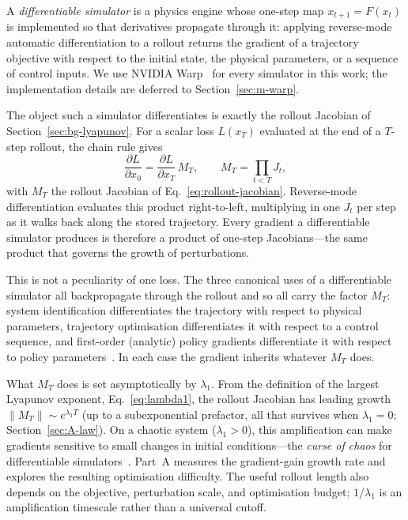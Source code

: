 \documentclass[11pt]{article}
\newcommand{\norm}[1]{\left\lVert #1 \right\rVert}
\begin{document}
A \emph{differentiable simulator} is a physics engine whose one-step map $x_{t+1}=F(x_t)$ is implemented so that derivatives propagate through it: applying reverse-mode automatic differentiation to a rollout returns the gradient of a trajectory objective with respect to the initial state, the physical parameters, or a sequence of control inputs. We use NVIDIA Warp~\cite{macklin2022warp} for every simulator in this work; the implementation details are deferred to Section~\ref{sec:m-warp}.

The object such a simulator differentiates is exactly the rollout Jacobian of Section~\ref{sec:bg-lyapunov}. For a scalar loss $L(x_T)$ evaluated at the end of a $T$-step rollout, the chain rule gives
\begin{equation}
\frac{\partial L}{\partial x_0} = \frac{\partial L}{\partial x_T}\,M_T, \qquad M_T = \prod_{t<T} J_t,
\label{eq:loss-grad}
\end{equation}
with $M_T$ the rollout Jacobian of Eq.~\eqref{eq:rollout-jacobian}. Reverse-mode differentiation evaluates this product right-to-left, multiplying in one $J_t$ per step as it walks back along the stored trajectory. Every gradient a differentiable simulator produces is therefore a product of one-step Jacobians---the same product that governs the growth of perturbations.

This is not a peculiarity of one loss. The three canonical uses of a differentiable simulator all backpropagate through the rollout and so all carry the factor $M_T$: system identification differentiates the trajectory with respect to physical parameters, trajectory optimisation differentiates it with respect to a control sequence, and first-order (analytic) policy gradients differentiate it with respect to policy parameters~\cite{suh2022differentiable,parmas2018pipps}. In each case the gradient inherits whatever $M_T$ does.

What $M_T$ does is set asymptotically by $\lambda_1$. From the definition of the largest Lyapunov exponent, Eq.~\eqref{eq:lambda1}, the rollout Jacobian has leading growth $\norm{M_T}\sim e^{\lambda_1 T}$ (up to a subexponential prefactor, all that survives when $\lambda_1=0$; Section~\ref{sec:A-law}). On a chaotic system ($\lambda_1>0$), this amplification can make gradients sensitive to small changes in initial conditions---the \emph{curse of chaos} for differentiable simulators~\cite{metz2021gradients,parmas2018pipps,suh2022differentiable}. Part~A measures the gradient-gain growth rate and explores the resulting optimisation difficulty. The useful rollout length also depends on the objective, perturbation scale, and optimisation budget; $1/\lambda_1$ is an amplification timescale rather than a universal cutoff.
\end{document}
